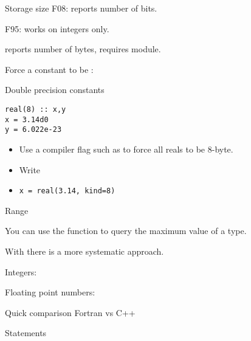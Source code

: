 \begin{block}{Storage size}
  F08:  reports number of bits.

  F95:  works on integers only.

   reports number of bytes, requires
   module.
\end{block}

Force a constant to be :
\begin{block}{Double precision constants}
  \label{sl:fdouble}
\begin{lstlisting}
real(8) :: x,y
x = 3.14d0
y = 6.022e-23
\end{lstlisting}
  \begin{itemize}
  \item Use a compiler flag such as  to force all reals to be 8-byte.
  \item Write 
  \item \verb+x = real(3.14, kind=8)+
  \end{itemize}
\end{block}

 {Range}

You can use the function  to query the maximum value of a type.


With  there is a more systematic approach.

Integers:


Floating point numbers:

\begin{comment}
  \url{https://docs.oracle.com/cd/E19957-01/805-4940/6j4m1u7pk/index.html}
  \url{https://fortranwiki.org/fortran/show/ieee_arithmetic}
\end{comment}


 {Quick comparison Fortran vs C++}

 {Statements}

